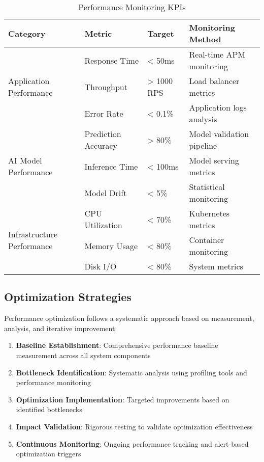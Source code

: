\begin{table}[H]
\centering
\caption{Performance Monitoring KPIs}
\begin{tabular}{|p{3cm}|p{3cm}|p{2cm}|p{4cm}|}
\hline
\textbf{Category} & \textbf{Metric} & \textbf{Target} & \textbf{Monitoring Method} \\
\hline
\multirow{3}{*}{Application Performance} & Response Time & < 50ms & Real-time APM monitoring \\
\cline{2-4}
 & Throughput & > 1000 RPS & Load balancer metrics \\
\cline{2-4}
 & Error Rate & < 0.1\% & Application logs analysis \\
\hline
\multirow{3}{*}{AI Model Performance} & Prediction Accuracy & > 80\% & Model validation pipeline \\
\cline{2-4}
 & Inference Time & < 100ms & Model serving metrics \\
\cline{2-4}
 & Model Drift & < 5\% & Statistical monitoring \\
\hline
\multirow{3}{*}{Infrastructure Performance} & CPU Utilization & < 70\% & Kubernetes metrics \\
\cline{2-4}
 & Memory Usage & < 80\% & Container monitoring \\
\cline{2-4}
 & Disk I/O & < 80\% & System metrics \\
\hline
\end{tabular}
\end{table}

\subsection{Optimization Strategies}

Performance optimization follows a systematic approach based on measurement, analysis, and iterative improvement:

\begin{enumerate}[leftmargin=*]
    \item \textbf{Baseline Establishment}: Comprehensive performance baseline measurement across all system components
    \item \textbf{Bottleneck Identification}: Systematic analysis using profiling tools and performance monitoring
    \item \textbf{Optimization Implementation}: Targeted improvements based on identified bottlenecks
    \item \textbf{Impact Validation}: Rigorous testing to validate optimization effectiveness
    \item \textbf{Continuous Monitoring}: Ongoing performance tracking and alert-based optimization triggers
\end{enumerate}

